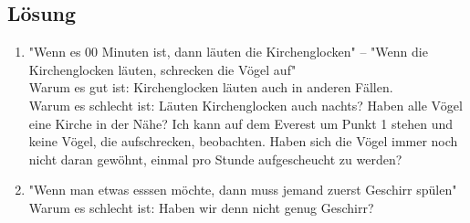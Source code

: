 \documentclass[
	12pt, %
	german, %
]{fphw}
\begin{document}

\subsection*{Lösung}

\begin{enumerate}
\item "Wenn es 00 Minuten ist, dann läuten die Kirchenglocken" -- "Wenn die Kirchenglocken läuten, schrecken die Vögel auf" \\
Warum es gut ist: Kirchenglocken läuten auch in anderen Fällen. \\
Warum es schlecht ist: Läuten Kirchenglocken auch nachts? Haben alle Vögel eine Kirche in der Nähe? Ich kann auf dem Everest um Punkt 1 stehen und keine Vögel, die aufschrecken, beobachten. Haben sich die Vögel immer noch nicht daran gewöhnt, einmal pro Stunde aufgescheucht zu werden?
\item "Wenn man etwas esssen möchte, dann muss jemand zuerst Geschirr spülen" \\
Warum es schlecht ist: Haben wir denn nicht genug Geschirr?
\end{enumerate}
\end{document}
